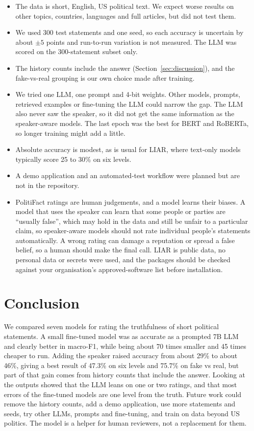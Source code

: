 \documentclass[10pt,a4paper,twoside]{article}
\begin{document}
\begin{itemize}
  \item The data is short, English, US political text. We expect worse results on other topics, countries, languages and full articles, but did not test them.
  \item We used 300 test statements and one seed, so each accuracy is uncertain by about $\pm5$ points and run-to-run variation is not measured. The LLM was scored on the 300-statement subset only.
  \item The history counts include the answer (Section~\ref{sec:discussion}), and the fake-vs-real grouping is our own choice made after training.
  \item We tried one LLM, one prompt and 4-bit weights. Other models, prompts, retrieved examples or fine-tuning the LLM could narrow the gap. The LLM also never saw the speaker, so it did not get the same information as the speaker-aware models. The last epoch was the best for BERT and RoBERTa, so longer training might add a little.
  \item Absolute accuracy is modest, as is usual for LIAR, where text-only models typically score 25 to 30\% on six levels.
  \item A demo application and an automated-test workflow were planned but are not in the repository.
  \item PolitiFact ratings are human judgements, and a model learns their biases. A model that uses the speaker can learn that some people or parties are ``usually false'', which may hold in the data and still be unfair to a particular claim, so speaker-aware models should not rate individual people's statements automatically. A wrong rating can damage a reputation or spread a false belief, so a human should make the final call. LIAR is public data, no personal data or secrets were used, and the packages should be checked against your organisation's approved-software list before installation.
\end{itemize}

\section{Conclusion}

We compared seven models for rating the truthfulness of short political statements. A small fine-tuned model was as accurate as a prompted 7B LLM and clearly better in macro-F1, while being about 70 times smaller and 45 times cheaper to run. Adding the speaker raised accuracy from about 29\% to about 46\%, giving a best result of 47.3\% on six levels and 75.7\% on fake vs real, but part of that gain comes from history counts that include the answer. Looking at the outputs showed that the LLM leans on one or two ratings, and that most errors of the fine-tuned models are one level from the truth. Future work could remove the history counts, add a demo application, use more statements and seeds, try other LLMs, prompts and fine-tuning, and train on data beyond US politics. The model is a helper for human reviewers, not a replacement for them.
\end{document}
